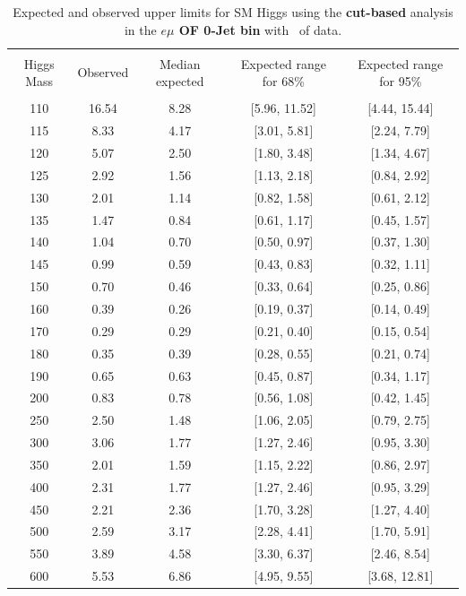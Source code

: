 \begin{table}[hbp!]
\begin{center}
\begin{tabular}{c c c c c}
\hline
\vspace{-3mm} && \\
 Higgs Mass & Observed  & Median expected & Expected range for 68\% & Expected range for 95\%   \\
\vspace{-3mm} && \\
\hline
110 & 16.54 & 8.28 & [5.96, 11.52] & [4.44, 15.44] \\
115 & 8.33 & 4.17 & [3.01, 5.81] & [2.24, 7.79] \\
120 & 5.07 & 2.50 & [1.80, 3.48] & [1.34, 4.67] \\
125 & 2.92 & 1.56 & [1.13, 2.18] & [0.84, 2.92] \\
130 & 2.01 & 1.14 & [0.82, 1.58] & [0.61, 2.12] \\
135 & 1.47 & 0.84 & [0.61, 1.17] & [0.45, 1.57] \\
140 & 1.04 & 0.70 & [0.50, 0.97] & [0.37, 1.30] \\
145 & 0.99 & 0.59 & [0.43, 0.83] & [0.32, 1.11] \\
150 & 0.70 & 0.46 & [0.33, 0.64] & [0.25, 0.86] \\
160 & 0.39 & 0.26 & [0.19, 0.37] & [0.14, 0.49] \\
170 & 0.29 & 0.29 & [0.21, 0.40] & [0.15, 0.54] \\
180 & 0.35 & 0.39 & [0.28, 0.55] & [0.21, 0.74] \\
190 & 0.65 & 0.63 & [0.45, 0.87] & [0.34, 1.17] \\
200 & 0.83 & 0.78 & [0.56, 1.08] & [0.42, 1.45] \\
250 & 2.50 & 1.48 & [1.06, 2.05] & [0.79, 2.75] \\
300 & 3.06 & 1.77 & [1.27, 2.46] & [0.95, 3.30] \\
350 & 2.01 & 1.59 & [1.15, 2.22] & [0.86, 2.97] \\
400 & 2.31 & 1.77 & [1.27, 2.46] & [0.95, 3.29] \\
450 & 2.21 & 2.36 & [1.70, 3.28] & [1.27, 4.40] \\
500 & 2.59 & 3.17 & [2.28, 4.41] & [1.70, 5.91] \\
550 & 3.89 & 4.58 & [3.30, 6.37] & [2.46, 8.54] \\
600 & 5.53 & 6.86 & [4.95, 9.55] & [3.68, 12.81] \\
\hline
\end{tabular}
\caption{Expected and observed upper limits for SM Higgs using the
  {\bf cut-based} analysis in the {\bf $e\mu$ OF 0-Jet bin} with \intlumiEightTeV\ of data.}
\label{tab:cutbase_uls_0jof}
\end{center}
\end{table}



